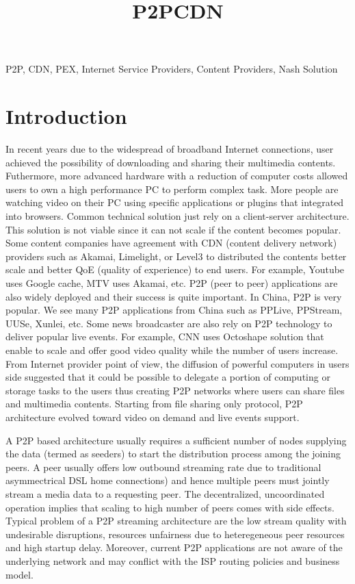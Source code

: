 \documentclass[paper]{ieice}
\title{P2PCDN}
\begin{document}
\maketitle

\begin{summary}
\end{summary}
\begin{keywords}
P2P, CDN, PEX, Internet Service Providers, Content Providers, Nash Solution 
\end{keywords} 


\section{Introduction}\label{intro}
In recent years due to the widespread of broadband Internet connections, user achieved the possibility of downloading and sharing their multimedia contents.
Futhermore, more advanced hardware with a reduction of computer costs allowed users to own a high performance PC to perform complex task.
More people are watching video on their PC using specific applications or plugins that integrated into browsers.
Common technical solution just rely on a client-server architecture.
This solution is not viable since it can not scale if the content becomes popular.
Some content companies have agreement with CDN (content delivery network) providers such as Akamai, Limelight, or Level3 to distributed the contents better scale and better QoE (quality of experience) to end users.
For example, Youtube uses Google cache, MTV uses Akamai, etc. P2P (peer to peer) applications are also widely deployed and their success is quite important. 
In China, P2P is very popular. 
We see many P2P applications from China such as PPLive, PPStream, UUSe, Xunlei, etc.  
Some news broadcaster are also rely on P2P technology to deliver popular live events.
For example, CNN uses Octoshape solution that enable to scale and offer good video quality while the number of users increase.
From Internet provider point of view, the diffusion of powerful computers in users side suggested that it could be possible to delegate a portion of computing or storage tasks to the users thus creating P2P networks where users can share files and multimedia contents.
Starting from file sharing only protocol, P2P architecture evolved toward video on demand and live events support. 

A P2P based architecture usually requires a sufficient number of nodes supplying the data (termed as seeders) to start the distribution process among the joining peers.
A peer usually offers low outbound streaming rate due to traditional asymmectrical DSL home connections) and hence multiple peers must jointly stream a media data to a requesting peer. 
The decentralized, uncoordinated operation implies that scaling to high number of peers comes with side effects.
Typical problem of a P2P streaming architecture are the low stream quality with undesirable disruptions, resources unfairness due to heteregeneous peer resources and high startup delay.
Moreover, current P2P applications are not aware of the underlying network and may conflict with the ISP routing policies and business model.
\end{document}
